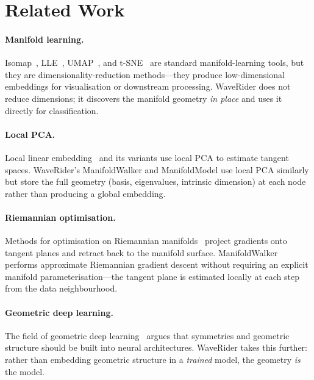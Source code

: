 \documentclass[12pt,letterpaper]{article}
\begin{document}
\section{Related Work}

\paragraph{Manifold learning.}
Isomap~\cite{isomap}, LLE~\cite{lle}, UMAP~\cite{umap}, and t-SNE~\cite{tsne}
are standard manifold-learning tools, but they are dimensionality-reduction
methods---they produce low-dimensional embeddings for visualisation or downstream
processing.  WaveRider does not reduce dimensions; it discovers the manifold
geometry \emph{in place} and uses it directly for classification.

\paragraph{Local PCA.}
Local linear embedding~\cite{lle} and its variants use local PCA to estimate
tangent spaces.  WaveRider's ManifoldWalker and ManifoldModel use local PCA
similarly but store the full geometry (basis, eigenvalues, intrinsic dimension)
at each node rather than producing a global embedding.

\paragraph{Riemannian optimisation.}
Methods for optimisation on Riemannian manifolds~\cite{absil09,bonnabel13}
project gradients onto tangent planes and retract back to the manifold surface.
ManifoldWalker performs approximate Riemannian gradient descent without requiring
an explicit manifold parameterisation---the tangent plane is estimated locally
at each step from the data neighbourhood.

\paragraph{Geometric deep learning.}
The field of geometric deep learning~\cite{bronstein21} argues that symmetries
and geometric structure should be built into neural architectures.  WaveRider
takes this further: rather than embedding geometric structure in a \emph{trained}
model, the geometry \emph{is} the model.
\end{document}
